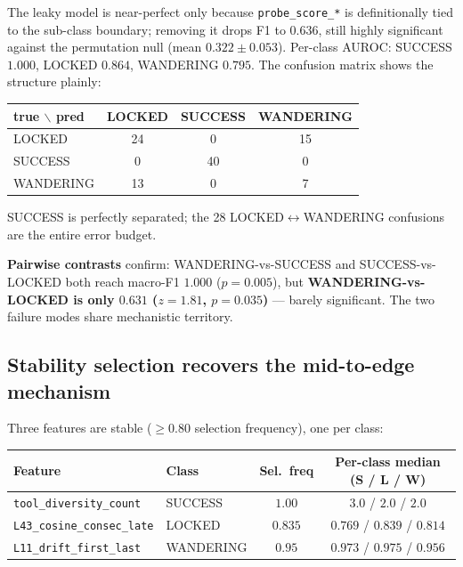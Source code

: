 \documentclass[11pt]{article}
\begin{document}
The leaky model is near-perfect only because \texttt{probe\_score\_*} is definitionally tied to the sub-class boundary; removing it drops F1 to $0.636$, still highly significant against the permutation null (mean $0.322\pm0.053$). Per-class AUROC: SUCCESS $1.000$, LOCKED $0.864$, WANDERING $0.795$. The confusion matrix shows the structure plainly:
\begin{center}
\begin{tabular}{lccc}
\toprule
true $\backslash$ pred & LOCKED & SUCCESS & WANDERING \\
\midrule
LOCKED & 24 & 0 & 15 \\
SUCCESS & 0 & 40 & 0 \\
WANDERING & 13 & 0 & 7 \\
\bottomrule
\end{tabular}
\end{center}
SUCCESS is perfectly separated; the 28 LOCKED$\leftrightarrow$WANDERING confusions are the entire error budget.

\textbf{Pairwise contrasts} confirm: WANDERING-vs-SUCCESS and SUCCESS-vs-LOCKED both reach macro-F1 $1.000$ ($p{=}0.005$), but \textbf{WANDERING-vs-LOCKED is only $0.631$ ($z{=}1.81$, $p{=}0.035$)} --- barely significant. The two failure modes share mechanistic territory.

\subsection{Stability selection recovers the mid-to-edge mechanism}

Three features are stable ($\ge 0.80$ selection frequency), one per class:

\begin{center}
\begin{tabular}{llcc}
\toprule
Feature & Class & Sel.\ freq & Per-class median (S / L / W) \\
\midrule
\texttt{tool\_diversity\_count} & SUCCESS & $1.00$ & $3.0$ / $2.0$ / $2.0$ \\
\texttt{L43\_cosine\_consec\_late} & LOCKED & $0.835$ & $0.769$ / $\mathbf{0.839}$ / $0.814$ \\
\texttt{L11\_drift\_first\_last} & WANDERING & $0.95$ & $0.973$ / $0.975$ / $\mathbf{0.956}$ \\
\bottomrule
\end{tabular}
\end{center}
\end{document}
